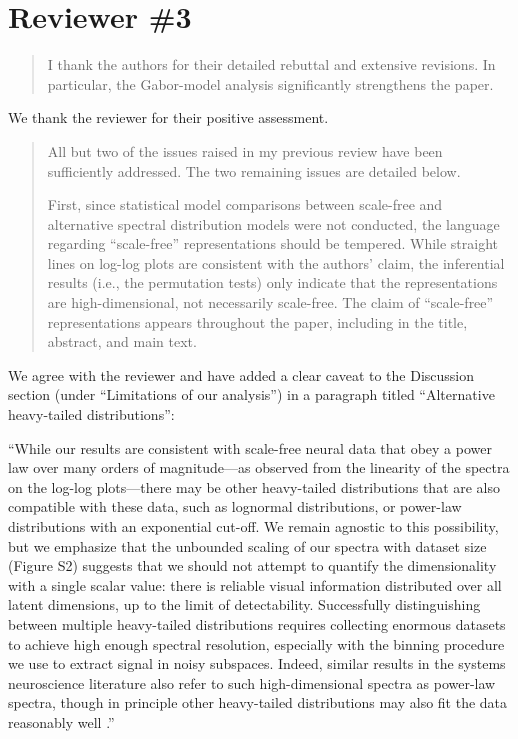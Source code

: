 \documentclass[10pt]{article}
\begin{document}
\section{Reviewer \#3}\label{reviewer-3}

\begin{quote}
I thank the authors for their detailed rebuttal and extensive revisions. In particular, the Gabor-model analysis significantly strengthens the paper.
\end{quote}

We thank the reviewer for their positive assessment.

\begin{quote}
All but two of the issues raised in my previous review have been sufficiently addressed. The two remaining issues are detailed below.

First, since statistical model comparisons between scale-free and alternative spectral distribution models were not conducted, the language regarding ``scale-free'' representations should be tempered. While straight lines on log-log plots are consistent with the authors' claim, the inferential results (i.e., the permutation tests) only indicate that the representations are high-dimensional, not necessarily scale-free. The claim of ``scale-free'' representations appears throughout the paper, including in the title, abstract, and main text.
\end{quote}

We agree with the reviewer and have added a clear caveat to the Discussion section (under ``Limitations of our analysis'') in a paragraph titled ``Alternative heavy-tailed distributions'':

``While our results are consistent with scale-free neural data that obey a power law over many orders of magnitude---as observed from the linearity of the spectra on the log-log plots---there may be other heavy-tailed distributions that are also compatible with these data, such as lognormal distributions, or power-law distributions with an exponential cut-off. We remain agnostic to this possibility, but we emphasize that the unbounded scaling of our spectra with dataset size (Figure S2) suggests that we should not attempt to quantify the dimensionality with a single scalar value: there is reliable visual information distributed over all latent dimensions, up to the limit of detectability. Successfully distinguishing between multiple heavy-tailed distributions requires collecting enormous datasets to achieve high enough spectral resolution, especially with the binning procedure we use to extract signal in noisy subspaces. Indeed, similar results in the systems neuroscience literature also refer to such high-dimensional spectra as power-law spectra, though in principle other heavy-tailed distributions may also fit the data reasonably well \autocite{Stringer2019,Manley2024}.''
\end{document}
